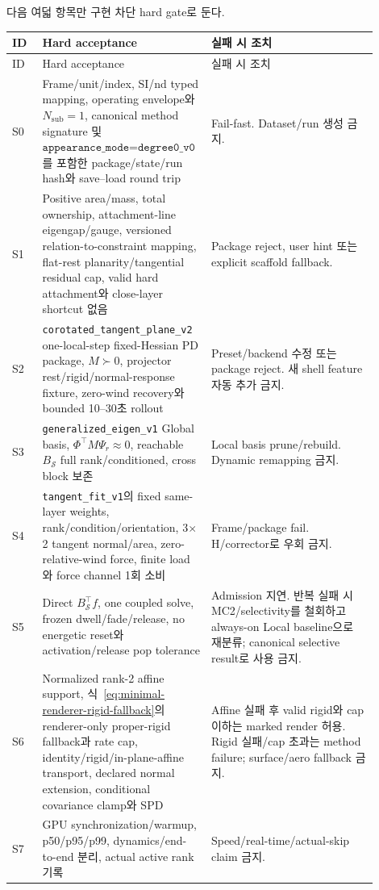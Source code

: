 \documentclass[11pt]{article}
\begin{document}
다음 여덟 항목만 구현 차단 hard gate로 둔다.

\begin{longtable}{L{0.08\linewidth}L{0.38\linewidth}L{0.44\linewidth}}
\toprule
ID & Hard acceptance & 실패 시 조치\\
\midrule
\endfirsthead
\toprule
ID & Hard acceptance & 실패 시 조치\\
\midrule
\endhead
S0 & Frame/unit/index, SI/nd typed mapping, operating envelope와 \(N_{\mathrm{sub}}=1\),
canonical method signature 및 \(\texttt{appearance\_mode=degree0\_v0}\)를 포함한
package/state/run hash와 save--load round trip &
Fail-fast. Dataset/run 생성 금지.\\
S1 & Positive area/mass, total ownership, attachment-line eigengap/gauge, versioned relation-to-constraint
mapping, flat-rest planarity/tangential residual cap, valid hard attachment와 close-layer shortcut 없음 &
Package reject, user hint 또는 explicit scaffold fallback.\\
S2 & \texttt{corotated\_tangent\_plane\_v2} one-local-step fixed-Hessian PD package,
\(M\succ0\), projector rest/rigid/normal-response fixture, zero-wind recovery와 bounded 10--30초 rollout &
Preset/backend 수정 또는 package reject. 새 shell feature 자동 추가 금지.\\
S3 & \texttt{generalized\_eigen\_v1} Global basis,
\(\Phi^\top M\Psi_r\approx0\), reachable \(B_{\mathcal S}\) full rank/conditioned, cross block 보존 &
Local basis prune/rebuild. Dynamic remapping 금지.\\
S4 & \texttt{tangent\_fit\_v1}의 fixed same-layer weights, rank/condition/orientation,
3\(\times\)2 tangent normal/area, zero-relative-wind force, finite load와 force channel 1회 소비 &
Frame/package fail. H/corrector로 우회 금지.\\
S5 & Direct \(B_{\mathcal S}^\top f\), one coupled solve, frozen dwell/fade/release,
no energetic reset와 activation/release pop tolerance &
Admission 지연. 반복 실패 시 MC2/selectivity를 철회하고 always-on Local baseline으로 재분류;
canonical selective result로 사용 금지.\\
S6 & Normalized rank-2 affine support, 식~\eqref{eq:minimal-renderer-rigid-fallback}의
renderer-only proper-rigid fallback과 rate cap, identity/rigid/in-plane-affine transport,
declared normal extension, conditional covariance clamp와 SPD &
Affine 실패 후 valid rigid와 cap 이하는 marked render 허용.
Rigid 실패/cap 초과는 method failure; surface/aero fallback 금지.\\
S7 & GPU synchronization/warmup, p50/p95/p99, dynamics/end-to-end 분리,
actual active rank 기록 &
Speed/real-time/actual-skip claim 금지.\\
\bottomrule
\end{longtable}
\end{document}
